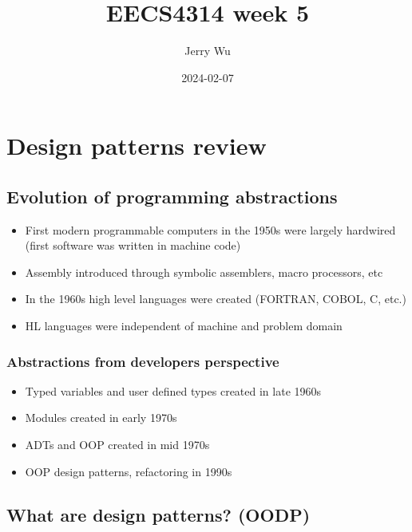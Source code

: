 \documentclass[12pt]{book}
\title{EECS4314 week 5}
\author{Jerry Wu}
\date{2024-02-07}
\begin{document}
\maketitle
\tableofcontents

\chapter{Design patterns review}

\section{Evolution of programming abstractions}

\begin{itemize}
  \item First modern programmable computers in the 1950s were largely hardwired (first software was written in machine code)
  \item Assembly introduced through symbolic assemblers, macro processors, etc
  \item In the 1960s high level languages were created (FORTRAN, COBOL, C, etc.)
  \item HL languages were independent of machine and problem domain
\end{itemize}

\subsection{Abstractions from developers perspective}

\begin{itemize}
  \item Typed variables and user defined types created in late 1960s
  \item Modules created in early 1970s
  \item ADTs and OOP created in mid 1970s
  \item OOP design patterns, refactoring in 1990s
\end{itemize}

\section{What are design patterns? (OODP)}
\end{document}

